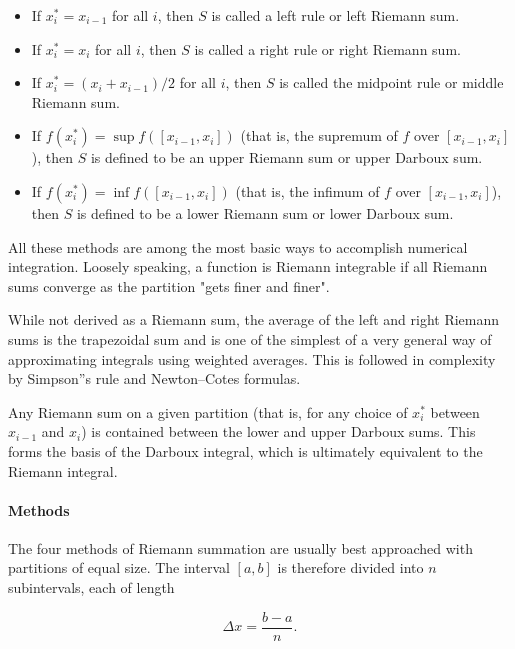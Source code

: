 \begin{itemize}
    \item If $x_i^* = x_{i-1}$ for all $i$, then $S$ is called a left rule or left Riemann sum.
    \item If $x_i^* = x_i$ for all $i$, then $S$ is called a right rule or right Riemann sum.
    \item If $x_i^* = (x_i + x_{i-1})/2$ for all $i$, then $S$ is called the midpoint rule or middle Riemann sum.
    \item If $f(x_i^*) = \sup f([x_{i-1},x_i])$ (that is, the supremum of $f$ over $[x_{i-1},x_i]$), then $S$ is defined to be an upper Riemann sum or upper Darboux sum.
    \item If $f(x_i^*) = \inf f([x_{i-1},x_i])$ (that is, the infimum of $f$ over $[x_{i-1},x_i]$), then $S$ is defined to be a lower Riemann sum or lower Darboux sum.
\end{itemize}

All these methods are among the most basic ways to accomplish numerical integration. Loosely speaking, a function is Riemann integrable if all Riemann sums converge as the partition "gets finer and finer".



While not derived as a Riemann sum, the average of the left and right Riemann sums is the trapezoidal sum and is one of the simplest of a very general way of approximating integrals using weighted averages. This is followed in complexity by Simpson''s rule and Newton–Cotes formulas.



Any Riemann sum on a given partition (that is, for any choice of $x_i^*$ between $x_{i-1}$ and $x_i$) is contained between the lower and upper Darboux sums. This forms the basis of the Darboux integral, which is ultimately equivalent to the Riemann integral.



\paragraph{Methods}



The four methods of Riemann summation are usually best approached with partitions of equal size. The interval $[a, b]$ is therefore divided into $n$ subintervals, each of length



$$\Delta x = \frac{b-a}{n}.$$



